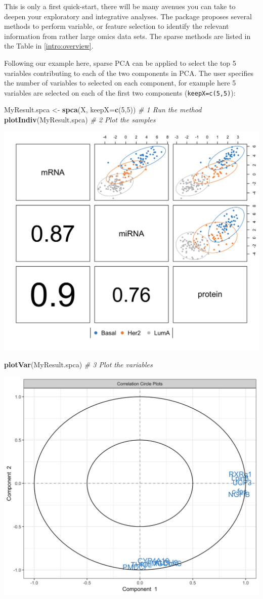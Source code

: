 \documentclass[]{book}
\newenvironment{Shaded}{\begin{snugshade}}{\end{snugshade}}
\newcommand{\KeywordTok}[1]{\textcolor[rgb]{0.13,0.29,0.53}{\textbf{#1}}}
\newcommand{\DataTypeTok}[1]{\textcolor[rgb]{0.13,0.29,0.53}{#1}}
\newcommand{\DecValTok}[1]{\textcolor[rgb]{0.00,0.00,0.81}{#1}}
\newcommand{\StringTok}[1]{\textcolor[rgb]{0.31,0.60,0.02}{#1}}
\newcommand{\CommentTok}[1]{\textcolor[rgb]{0.56,0.35,0.01}{\textit{#1}}}
\newcommand{\NormalTok}[1]{#1}
\theoremstyle{definition}
\theoremstyle{definition}
\theoremstyle{definition}
\theoremstyle{remark}
\begin{document}
This is only a first quick-start, there will be many avenues you can
take to deepen your exploratory and integrative analyses. The package
proposes several methods to perform variable, or feature selection to
identify the relevant information from rather large omics data sets. The
sparse methods are listed in the Table in \ref{intro:overview}.

Following our example here, sparse PCA can be applied to select the top
5 variables contributing to each of the two components in PCA. The user
specifies the number of variables to selected on each component, for
example here 5 variables are selected on each of the first two
components (\texttt{keepX=c(5,5)}):

\begin{Shaded}
\begin{Highlighting}[]
\NormalTok{MyResult.spca <-}\StringTok{ }\KeywordTok{spca}\NormalTok{(X, }\DataTypeTok{keepX=}\KeywordTok{c}\NormalTok{(}\DecValTok{5}\NormalTok{,}\DecValTok{5}\NormalTok{)) }\CommentTok{# 1 Run the method}
\KeywordTok{plotIndiv}\NormalTok{(MyResult.spca)               }\CommentTok{# 2 Plot the samples}
\end{Highlighting}
\end{Shaded}

\begin{center}\includegraphics[width=0.5\linewidth]{Figures/unnamed-chunk-6-1} \end{center}

\begin{Shaded}
\begin{Highlighting}[]
\KeywordTok{plotVar}\NormalTok{(MyResult.spca)                 }\CommentTok{# 3 Plot the variables}
\end{Highlighting}
\end{Shaded}

\begin{center}\includegraphics[width=0.5\linewidth]{Figures/unnamed-chunk-6-2} \end{center}
\end{document}
